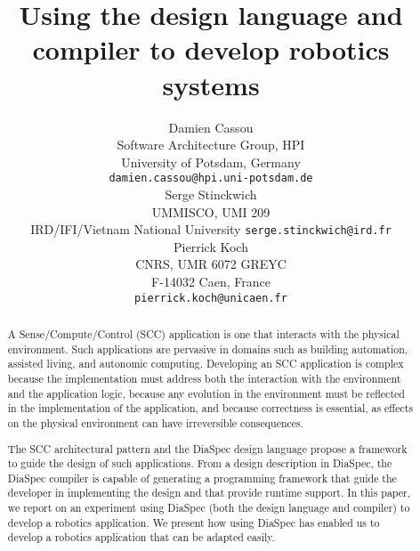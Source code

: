 \documentclass[letterpaper, 10 pt, conference]{ieeeconf}  %
\title{Using the \diaspec{} design language and compiler to develop
  robotics systems}
\author{%
  \parbox{2.4 in}{\centering Damien Cassou\\
    Software Architecture Group, HPI\\
    University of Potsdam, Germany\\%
    {\tt\small damien.cassou@hpi.uni-potsdam.de}}
  \hspace*{ 0.1 in}
  \parbox{2.35 in}{ \centering Serge Stinckwich\\
UMMISCO, UMI 209\\IRD/IFI/Vietnam National University
    {\tt\small serge.stinckwich@ird.fr}}
  \hspace*{ 0.1 in}
  \parbox{1.9 in}{ \centering Pierrick Koch\\
CNRS, UMR 6072 GREYC\\ F-14032 Caen, France\\
    {\tt\small pierrick.koch@unicaen.fr}}
}
\newcommand{\diaspec}{Dia\-Spec\xspace}
\begin{document}
\maketitle
\thispagestyle{empty}
\pagestyle{empty}


\begin{abstract}

  A Sense/Compute/Control (SCC) application is one that interacts with
  the physical environment. Such applications are pervasive in domains
  such as building automation, assisted living, and autonomic
  computing. Developing an SCC application is complex because the
  implementation must address both the interaction with the
  environment and the application logic, because any evolution in the
  environment must be reflected in the implementation of the
  application, and because correctness is essential, as effects on the
  physical environment can have irreversible consequences.

  The SCC architectural pattern and the \diaspec{} design language
  propose a framework to guide the design of such applications. From a
  design description in \diaspec{}, the \diaspec{} compiler is capable
  of generating a programming framework that guide the developer in
  implementing the design and that provide runtime support. In this
  paper, we report on an experiment using \diaspec{} (both the design
  language and compiler) to develop a robotics application. We present
  how using \diaspec{} has enabled us to develop a robotics
  application that can be adapted easily.

\end{abstract}










\end{document}
